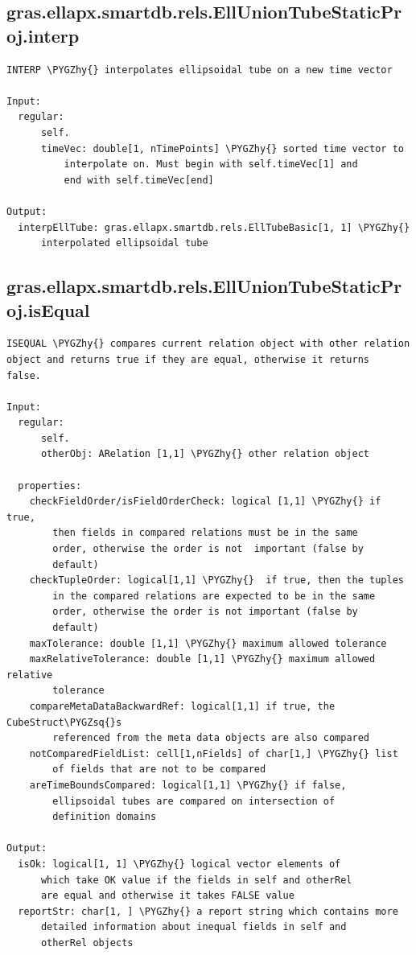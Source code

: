 \documentclass[letterpaper,10pt,english]{sphinxmanual}
\def\PYGZhy{\char`\-}
\def\PYGZsq{\char`\'}
\begin{document}
\subsection{gras.ellapx.smartdb.rels.EllUnionTubeStaticProj.interp}
\label{chap_functions:gras-ellapx-smartdb-rels-elluniontubestaticproj-interp}
\begin{Verbatim}[commandchars=\\\{\}]
INTERP \PYGZhy{} interpolates ellipsoidal tube on a new time vector

Input:
  regular:
      self.
      timeVec: double[1, nTimePoints] \PYGZhy{} sorted time vector to
          interpolate on. Must begin with self.timeVec[1] and
          end with self.timeVec[end]

Output:
  interpEllTube: gras.ellapx.smartdb.rels.EllTubeBasic[1, 1] \PYGZhy{}
      interpolated ellipsoidal tube
\end{Verbatim}


\subsection{gras.ellapx.smartdb.rels.EllUnionTubeStaticProj.isEqual}
\label{chap_functions:gras-ellapx-smartdb-rels-elluniontubestaticproj-isequal}
\begin{Verbatim}[commandchars=\\\{\}]
ISEQUAL \PYGZhy{} compares current relation object with other relation
object and returns true if they are equal, otherwise it returns
false.

Input:
  regular:
      self.
      otherObj: ARelation [1,1] \PYGZhy{} other relation object

  properties:
    checkFieldOrder/isFieldOrderCheck: logical [1,1] \PYGZhy{} if true,
        then fields in compared relations must be in the same
        order, otherwise the order is not  important (false by
        default)
    checkTupleOrder: logical[1,1] \PYGZhy{}  if true, then the tuples
        in the compared relations are expected to be in the same
        order, otherwise the order is not important (false by
        default)
    maxTolerance: double [1,1] \PYGZhy{} maximum allowed tolerance
    maxRelativeTolerance: double [1,1] \PYGZhy{} maximum allowed relative
        tolerance
    compareMetaDataBackwardRef: logical[1,1] if true, the CubeStruct\PYGZsq{}s
        referenced from the meta data objects are also compared
    notComparedFieldList: cell[1,nFields] of char[1,] \PYGZhy{} list
        of fields that are not to be compared
    areTimeBoundsCompared: logical[1,1] \PYGZhy{} if false,
        ellipsoidal tubes are compared on intersection of
        definition domains

Output:
  isOk: logical[1, 1] \PYGZhy{} logical vector elements of
      which take OK value if the fields in self and otherRel
      are equal and otherwise it takes FALSE value
  reportStr: char[1, ] \PYGZhy{} a report string which contains more
      detailed information about inequal fields in self and
      otherRel objects
\end{Verbatim}
\end{document}
